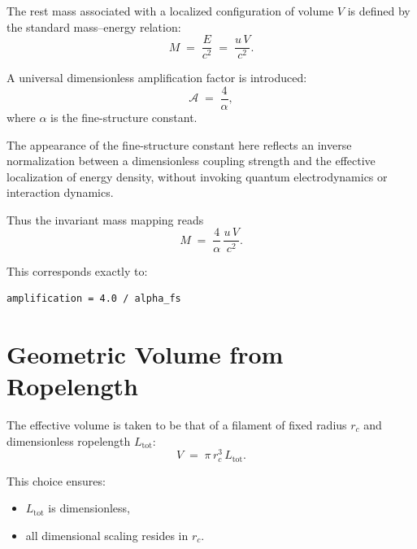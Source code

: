 \documentclass[11pt,a4paper]{article}
\begin{document}
        The rest mass associated with a localized configuration of volume $V$ is defined
        by the standard mass--energy relation:
        \begin{equation}
            M \;=\; \frac{E}{c^2} \;=\; \frac{u\,V}{c^2}.
        \end{equation}

        A universal dimensionless amplification factor is introduced:
        \begin{equation}
            \mathcal{A} \;=\; \frac{4}{\alpha},
        \end{equation}
        where $\alpha$ is the fine-structure constant.

        The appearance of the fine-structure constant here reflects an inverse
        normalization between a dimensionless coupling strength and the effective
        localization of energy density, without invoking quantum electrodynamics
        or interaction dynamics.


        Thus the invariant mass mapping reads
        \begin{equation}
            M \;=\; \frac{4}{\alpha}\,\frac{u\,V}{c^2}.
            \label{eq:base_mass}
        \end{equation}

        This corresponds exactly to:
        \begin{verbatim}
amplification = 4.0 / alpha_fs
        \end{verbatim}

    \section{Geometric Volume from Ropelength}

        The effective volume is taken to be that of a filament of fixed radius $r_c$
        and dimensionless ropelength $L_{\text{tot}}$:
        \begin{equation}
            V \;=\; \pi\,r_c^3\,L_{\text{tot}} .
            \label{eq:volume}
        \end{equation}

        This choice ensures:
        \begin{itemize}
            \item $L_{\text{tot}}$ is dimensionless,
            \item all dimensional scaling resides in $r_c$.
        \end{itemize}
\end{document}
